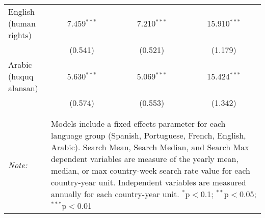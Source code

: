 \begin{table}[!htbp]
\begin{tabular}{@{\extracolsep{5pt}}lccc}
  English (human rights) & 7.459$^{***}$ & 7.210$^{***}$ & 15.910$^{***}$ \\ 
  & (0.541) & (0.521) & (1.179) \\ 
  Arabic (huquq alansan) & 5.630$^{***}$ & 5.069$^{***}$ & 15.424$^{***}$ \\ 
  & (0.574) & (0.553) & (1.342) \\ 
 \hline \\[-1.8ex] 
\hline 
\hline \\[-1.8ex] 
\textit{Note:}  & \multicolumn{3}{l}{\parbox[t]{8cm}{Models include a fixed effects parameter for each language group (Spanish, Portuguese, French, English, Arabic). Search Mean, Search Median, and Search Max dependent variables are measure of the yearly mean, median, or max country-week search rate value for each country-year unit. Independent variables are measured annually for each country-year unit. $^{*}$p$<$0.1; $^{**}$p$<$0.05; $^{***}$p$<$0.01}} \\ 
\end{tabular} 
\end{table} 
